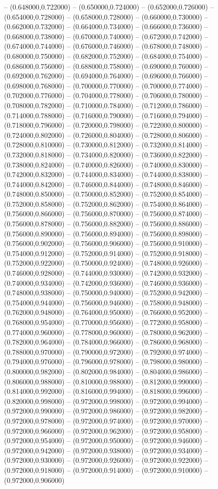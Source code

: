 -- (0.648000,0.722000) -- (0.650000,0.724000) -- (0.652000,0.726000) -- (0.654000,0.728000) -- (0.658000,0.728000) -- (0.660000,0.730000) -- (0.662000,0.732000) -- (0.664000,0.734000) -- (0.666000,0.736000) -- (0.668000,0.738000) -- (0.670000,0.740000) -- (0.672000,0.742000) -- (0.674000,0.744000) -- (0.676000,0.746000) -- (0.678000,0.748000) -- (0.680000,0.750000) -- (0.682000,0.752000) -- (0.684000,0.754000) -- (0.686000,0.756000) -- (0.688000,0.758000) -- (0.690000,0.760000) -- (0.692000,0.762000) -- (0.694000,0.764000) -- (0.696000,0.766000) -- (0.698000,0.768000) -- (0.700000,0.770000) -- (0.700000,0.774000) -- (0.702000,0.776000) -- (0.704000,0.778000) -- (0.706000,0.780000) -- (0.708000,0.782000) -- (0.710000,0.784000) -- (0.712000,0.786000) -- (0.714000,0.788000) -- (0.716000,0.790000) -- (0.716000,0.794000) -- (0.718000,0.796000) -- (0.720000,0.798000) -- (0.722000,0.800000) -- (0.724000,0.802000) -- (0.726000,0.804000) -- (0.728000,0.806000) -- (0.728000,0.810000) -- (0.730000,0.812000) -- (0.732000,0.814000) -- (0.732000,0.818000) -- (0.734000,0.820000) -- (0.736000,0.822000) -- (0.738000,0.824000) -- (0.740000,0.826000) -- (0.740000,0.830000) -- (0.742000,0.832000) -- (0.744000,0.834000) -- (0.744000,0.838000) -- (0.744000,0.842000) -- (0.746000,0.844000) -- (0.748000,0.846000) -- (0.748000,0.850000) -- (0.750000,0.852000) -- (0.752000,0.854000) -- (0.752000,0.858000) -- (0.752000,0.862000) -- (0.754000,0.864000) -- (0.756000,0.866000) -- (0.756000,0.870000) -- (0.756000,0.874000) -- (0.756000,0.878000) -- (0.756000,0.882000) -- (0.756000,0.886000) -- (0.756000,0.890000) -- (0.756000,0.894000) -- (0.756000,0.898000) -- (0.756000,0.902000) -- (0.756000,0.906000) -- (0.756000,0.910000) -- (0.754000,0.912000) -- (0.752000,0.914000) -- (0.752000,0.918000) -- (0.752000,0.922000) -- (0.750000,0.924000) -- (0.748000,0.926000) -- (0.746000,0.928000) -- (0.744000,0.930000) -- (0.742000,0.932000) -- (0.740000,0.934000) -- (0.742000,0.936000) -- (0.746000,0.936000) -- (0.748000,0.938000) -- (0.750000,0.940000) -- (0.752000,0.942000) -- (0.754000,0.944000) -- (0.756000,0.946000) -- (0.758000,0.948000) -- (0.762000,0.948000) -- (0.764000,0.950000) -- (0.766000,0.952000) -- (0.768000,0.954000) -- (0.770000,0.956000) -- (0.772000,0.958000) -- (0.774000,0.960000) -- (0.778000,0.960000) -- (0.780000,0.962000) -- (0.782000,0.964000) -- (0.784000,0.966000) -- (0.786000,0.968000) -- (0.788000,0.970000) -- (0.790000,0.972000) -- (0.792000,0.974000) -- (0.794000,0.976000) -- (0.796000,0.978000) -- (0.798000,0.980000) -- (0.800000,0.982000) -- (0.802000,0.984000) -- (0.804000,0.986000) -- (0.806000,0.988000) -- (0.810000,0.988000) -- (0.812000,0.990000) -- (0.814000,0.992000) -- (0.816000,0.994000) -- (0.818000,0.996000) -- (0.820000,0.998000) -- (0.972000,0.998000) -- (0.972000,0.994000) -- (0.972000,0.990000) -- (0.972000,0.986000) -- (0.972000,0.982000) -- (0.972000,0.978000) -- (0.972000,0.974000) -- (0.972000,0.970000) -- (0.972000,0.966000) -- (0.972000,0.962000) -- (0.972000,0.958000) -- (0.972000,0.954000) -- (0.972000,0.950000) -- (0.972000,0.946000) -- (0.972000,0.942000) -- (0.972000,0.938000) -- (0.972000,0.934000) -- (0.972000,0.930000) -- (0.972000,0.926000) -- (0.972000,0.922000) -- (0.972000,0.918000) -- (0.972000,0.914000) -- (0.972000,0.910000) -- (0.972000,0.906000) 